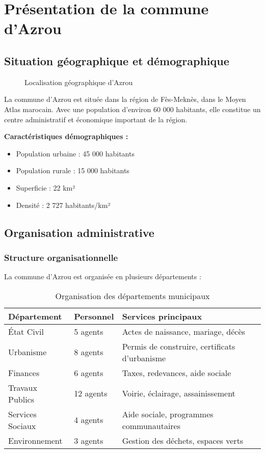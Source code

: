 \section{Présentation de la commune d'Azrou}

\subsection{Situation géographique et démographique}

\begin{figure}[h]
    \centering
    \caption{Localisation géographique d'Azrou}
    \label{fig:azrou_map}
\end{figure}

La commune d'Azrou est située dans la région de Fès-Meknès, dans le Moyen Atlas marocain. Avec une population d'environ 60 000 habitants, elle constitue un centre administratif et économique important de la région.

\textbf{Caractéristiques démographiques :}
\begin{itemize}
    \item Population urbaine : 45 000 habitants
    \item Population rurale : 15 000 habitants
    \item Superficie : 22 km²
    \item Densité : 2 727 habitants/km²
\end{itemize}

\subsection{Organisation administrative}

\subsubsection{Structure organisationnelle}

La commune d'Azrou est organisée en plusieurs départements :

\begin{table}[h]
\centering
\begin{tabular}{|l|l|p{6cm}|}
\hline
\textbf{Département} & \textbf{Personnel} & \textbf{Services principaux} \\
\hline
État Civil & 5 agents & Actes de naissance, mariage, décès \\
\hline
Urbanisme & 8 agents & Permis de construire, certificats d'urbanisme \\
\hline
Finances & 6 agents & Taxes, redevances, aide sociale \\
\hline
Travaux Publics & 12 agents & Voirie, éclairage, assainissement \\
\hline
Services Sociaux & 4 agents & Aide sociale, programmes communautaires \\
\hline
Environnement & 3 agents & Gestion des déchets, espaces verts \\
\hline
\end{tabular}
\caption{Organisation des départements municipaux}
\label{tab:departments}
\end{table}

